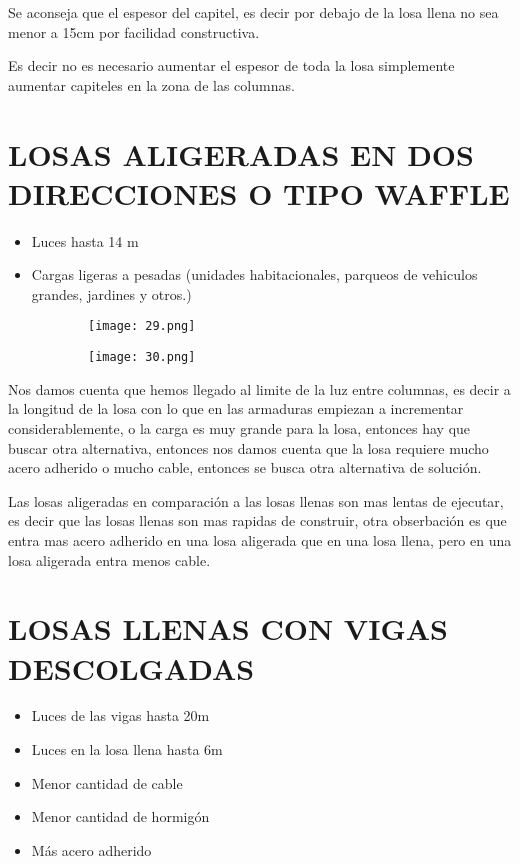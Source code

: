 Se aconseja que el espesor del capitel, es decir por debajo de la losa
llena no sea menor a 15cm por facilidad constructiva.

Es decir no es necesario aumentar el espesor de toda la losa
simplemente aumentar capiteles en la zona de las columnas.

\section{LOSAS ALIGERADAS EN DOS DIRECCIONES O TIPO WAFFLE}

\begin{itemize}
	\item Luces hasta 14 m
	\item {Cargas ligeras a pesadas (unidades habitacionales,
		parqueos de vehiculos grandes, jardines y otros.)}
\end{itemize}

\begin{figure}[H]
	\begin{subfigure}{0.5\textwidth}
	\centering
	\texttt{[image: 29.png]}
	\end{subfigure}
	\begin{subfigure}{0.5\textwidth}
	\centering
	\texttt{[image: 30.png]}
	\end{subfigure}
\end{figure}

Nos damos cuenta que hemos llegado al limite de la luz entre
columnas, es decir a la longitud de la losa con lo que en las
armaduras empiezan a incrementar considerablemente, o la carga
es muy grande para la losa, entonces hay que buscar otra
alternativa, entonces nos damos cuenta que la losa requiere
mucho acero adherido o mucho cable, entonces se busca otra
alternativa de solución.

Las losas aligeradas en comparación a las losas llenas
son mas lentas de ejecutar, es decir que las losas llenas
son mas rapidas de construir, otra obserbación es que entra
mas acero adherido en una losa aligerada que en una losa llena,
pero en una losa aligerada entra menos cable.

\section{LOSAS LLENAS CON VIGAS DESCOLGADAS}

\begin{itemize}
	\item Luces de las vigas hasta 20m
	\item Luces en la losa llena hasta 6m
	\item Menor cantidad de cable
	\item Menor cantidad de hormigón
	\item Más acero adherido
\end{itemize}

